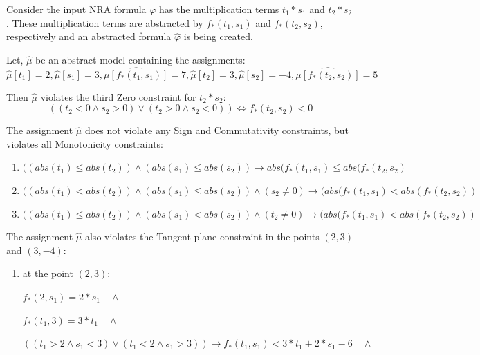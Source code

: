 \begin{example}
    Consider the input NRA formula $\varphi$ has the multiplication terms $t_{1} \ast s_{1}$ and $t_{2} \ast s_{2}$. 
    These multiplication terms are abstracted by $f_{\ast}(t_{1}, s_{1})$ and $f_{\ast}(t_{2}, s_{2})$, respectively and an abstracted formula $\hat{\varphi}$ is being created.\newline
    
    \noindent Let, $\hat{\mu}$ be an abstract model containing the assignments:
    $$\hat{\mu}[t_{1}] = 2, \hat{\mu}[s_{1}] = 3, \hat{\mu[f_{\ast}(t_{1}, s_{1})]} = 7, \hat{\mu}[t_{2}] = 3, \hat{\mu}[s_{2}] = -4, \hat{\mu[f_{\ast}(t_{2}, s_{2})]} = 5$$
    
    \noindent Then $\hat{\mu}$ violates the third Zero constraint for $t_{2} \ast s_{2}$:
    $$((t_{2} < 0 \wedge s_{2} > 0) \vee (t_{2} > 0 \wedge s_{2} < 0)) \Leftrightarrow f_{\ast}(t_{2}, s_{2}) < 0$$
    
    \noindent The assignment $\hat{\mu}$ does not violate any Sign and Commutativity constraints, but violates all Monotonicity constraints:
    \begin{enumerate}
    \item $((abs(t_{1}) \leq abs(t_{2})) \wedge (abs(s_{1}) \leq abs(s_{2})) \to abs(f_{\ast}(t_{1}, s_{1}) \leq abs(f_{\ast}(t_{2}, s_{2})$
    \item $((abs(t_{1}) < abs(t_{2})) \wedge (abs(s_{1}) \leq abs(s_{2})) \wedge (s_{2} \neq 0) \to (abs(f_{\ast}(t_{1}, s_{1}) < abs(f_{\ast}(t_{2}, s_{2}))$
    \item $((abs(t_{1}) \leq abs(t_{2})) \wedge (abs(s_{1}) < abs(s_{2})) \wedge (t_{2} \neq 0) \to (abs(f_{\ast}(t_{1}, s_{1}) < abs(f_{\ast}(t_{2}, s_{2}))$
    \end{enumerate}
    
    \noindent The assignment $\hat{\mu}$ also violates the Tangent-plane constraint in the points $(2, 3)$ and $(3, -4)$: 
    \begin{enumerate}
    \item at the point $(2, 3)$: 
    
    $f_{\ast}(2, s_{1}) = 2 \ast s_{1} \quad \wedge$
    
    $f_{\ast}(t_{1}, 3) = 3 \ast t_{1} \quad \wedge$
    
    $((t_{1} > 2 \wedge s_{1} < 3) \vee (t_{1} < 2 \wedge s_{1} > 3)) \to f_{\ast}(t_{1}, s_{1}) < 3 \ast t_{1} + 2 \ast s_{1} - 6 \quad \wedge$
    

\end{enumerate}
\end{example}
